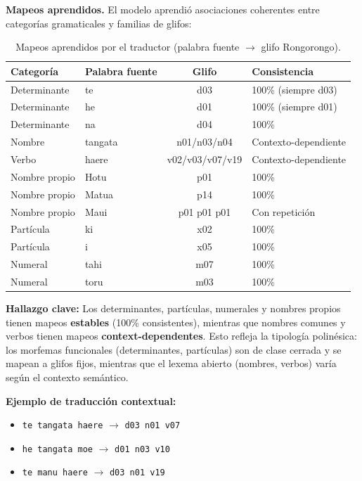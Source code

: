 \documentclass[11pt,a4paper]{article}
\newcommand{\1}{\mathbf{1}}
\numberwithin{equation}{section}
\begin{document}
\textbf{Mapeos aprendidos.} El modelo aprendió asociaciones coherentes entre categorías gramaticales y familias de glifos:

\begin{table}[h]
\centering
\caption{Mapeos aprendidos por el traductor (palabra fuente $\rightarrow$ glifo Rongorongo).}
\label{tab:rongorongo_mappings}
\begin{tabular}{llcl}
\toprule
Categoría & Palabra fuente & Glifo & Consistencia \\
\midrule
Determinante & te & d03 & 100\% (siempre d03) \\
Determinante & he & d01 & 100\% (siempre d01) \\
Determinante & na & d04 & 100\% \\
Nombre & tangata & n01/n03/n04 & Contexto-dependiente \\
Verbo & haere & v02/v03/v07/v19 & Contexto-dependiente \\
Nombre propio & Hotu & p01 & 100\% \\
Nombre propio & Matua & p14 & 100\% \\
Nombre propio & Maui & p01 p01 p01 & Con repetición \\
Partícula & ki & x02 & 100\% \\
Partícula & i & x05 & 100\% \\
Numeral & tahi & m07 & 100\% \\
Numeral & toru & m03 & 100\% \\
\bottomrule
\end{tabular}
\end{table}

\textbf{Hallazgo clave:} Los determinantes, partículas, numerales y nombres propios tienen mapeos \textbf{estables} (100\% consistentes), mientras que nombres comunes y verbos tienen mapeos \textbf{context-dependentes}. Esto refleja la tipología polinésica: los morfemas funcionales (determinantes, partículas) son de clase cerrada y se mapean a glifos fijos, mientras que el lexema abierto (nombres, verbos) varía según el contexto semántico.

\textbf{Ejemplo de traducción contextual:}
\begin{itemize}
    \item \texttt{te tangata haere} $\rightarrow$ \texttt{d03 n01 v07}
    \item \texttt{he tangata moe} $\rightarrow$ \texttt{d01 n03 v10}
    \item \texttt{te manu haere} $\rightarrow$ \texttt{d03 n01 v19}
\end{itemize}
\end{document}
